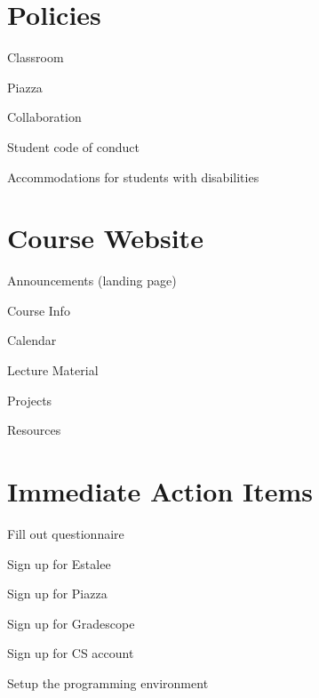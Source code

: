 \documentclass[8pt,a4paper,compress]{beamer}
\begin{document}
\section{Policies}
\begin{frame}[fragile]
\pause

Classroom

\pause\bigskip

Piazza

\pause\bigskip

Collaboration

\pause\bigskip

Student code of conduct

\pause\bigskip

Accommodations for students with disabilities
\end{frame}

\section{Course Website}
\begin{frame}[fragile]
\pause

Announcements (landing page)

\pause\bigskip

Course Info

\pause\bigskip

Calendar

\pause\bigskip

Lecture Material 

\pause\bigskip

Projects

\pause\bigskip

Resources
\end{frame}

\section{Immediate Action Items}
\begin{frame}[fragile]
\pause

Fill out questionnaire

\pause\bigskip

Sign up for Estalee

\pause\bigskip

Sign up for Piazza

\pause\bigskip

Sign up for Gradescope

\pause\bigskip

Sign up for CS account

\pause\bigskip

Setup the programming environment
\end{frame}
\end{document}
